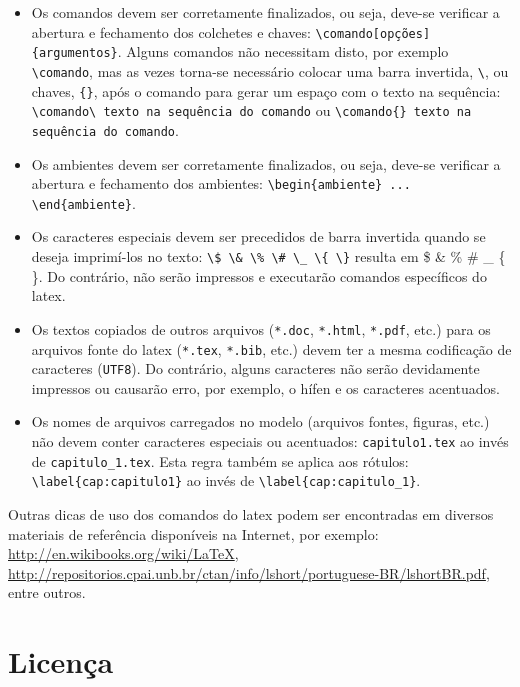 \begin{itemize}%
\item Os comandos devem ser corretamente finalizados, ou seja, deve-se verificar a abertura e fechamento dos colchetes e chaves: \verb|\comando[opções]{argumentos}|. Alguns comandos não necessitam disto, por exemplo \verb|\comando|, mas as vezes torna-se necessário colocar uma barra invertida, \verb|\|, ou chaves, \verb|{}|, após o comando para gerar um espaço com o texto na sequência: \verb|\comando\ texto na sequência do comando| ou \verb|\comando{} texto na sequência do comando|.
\item Os ambientes devem ser corretamente finalizados, ou seja, deve-se verificar a abertura e fechamento dos ambientes: \verb|\begin{ambiente} ... \end{ambiente}|.
\item Os caracteres especiais devem ser precedidos de barra invertida quando se deseja imprimí-los no texto: \verb|\$ \& \% \# \_ \{ \}| resulta em \$ \& \% \# \_ \{ \}. Do contrário, não serão impressos e executarão comandos específicos do \gls{latex}.
\item Os textos copiados de outros arquivos (\texttt{*.doc}, \texttt{*.html}, \texttt{*.pdf}, etc.) para os arquivos fonte do \gls{latex} (\texttt{*.tex}, \texttt{*.bib}, etc.) devem ter a mesma codificação de caracteres (\texttt{UTF8}). Do contrário, alguns caracteres não serão devidamente impressos ou causarão erro, por exemplo, o hífen e os caracteres acentuados.
\item Os nomes de arquivos carregados no modelo (arquivos fontes, figuras, etc.) não devem conter caracteres especiais ou acentuados: \verb|capitulo1.tex| ao invés de \verb|capitulo_1.tex|. Esta regra também se aplica aos rótulos: \verb|\label{cap:capitulo1}| ao invés de \verb|\label{cap:capitulo_1}|.
\end{itemize}

Outras dicas de uso dos comandos do \gls{latex} podem ser encontradas em diversos materiais de referência disponíveis na Internet, por exemplo: \url{http://en.wikibooks.org/wiki/LaTeX}, \url{http://repositorios.cpai.unb.br/ctan/info/lshort/portuguese-BR/lshortBR.pdf}, entre outros.

\section{Licença}\label{sec:licenca}

